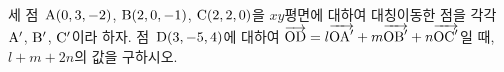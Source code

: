세 점~$\mathrm{A}(0{,}\mkern3mu\mathopen{}3{,}\mkern3mu\mathopen{}-2)$, $\mathrm{B}(2{,}\mkern3mu\mathopen{}0{,}\mkern3mu\mathopen{}-1)$, $\mathrm{C}(2{,}\mkern3mu\mathopen{}2{,}\mkern3mu\mathopen{}0)$을 $xy$평면에 대하여 대칭이동한 점을 각각 $\mathrm{A}'$, $\mathrm{B}'$, $\mathrm{C}'$이라 하자. 점~$\mathrm{D}(3{,}\mkern3mu\mathopen{}-5{,}\mkern3mu\mathopen{}4)$에 대하여 $\overrightarrow{\mathrm{OD}}=l\overrightarrow{\mathrm{OA}'}+m\overrightarrow{\mathrm{OB}'}+n\overrightarrow{\mathrm{OC}'}$일 때, $l+m+2n$의 값을 구하시오. 
